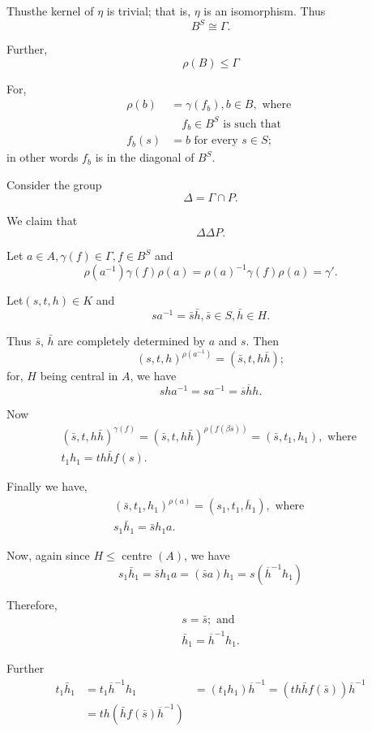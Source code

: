 Thus\pageoriginale the kernel of $\eta$ is trivial; that is, $\eta$ is an
isomorphism. Thus 
$$
B^S \cong \Gamma.
$$

Further,
$$
\rho (B)\leq \Gamma
$$

For,
\begin{align*}
  \rho (b)& =\gamma(f_b), b \in  B, \text{ where }\\
  &\quad f_b \in  B^S \text{ is such that}\\
  f_b(s)& = b \text{ for every }s \in  S;
\end{align*}
in other words $f_b$ is in the diagonal of $B^S$.

Consider the group
$$
\Delta =\Gamma \cap P.
$$

We claim that
$$
\Delta \Delta P.
$$

Let $a \in  A, \gamma (f) \in  \Gamma, f \in 
B^S$  and  
$$
\rho (a^{-1}) \gamma (f) \rho (a) = \rho (a)^{-1} \gamma (f) \rho (a)
= \gamma'. 
$$

Let\pageoriginale $(s,t,h) \in  K$ and 
$$
sa^{-1}= \bar{s} \bar{h}, \bar{s} \in  S, \bar{h} \in 
H. 
$$

Thus $\bar{s}$, $\bar{h}$ are completely determined by $a$ and
$s$. Then  
$$
(s, t, h)^{\rho(a^{-1})} =(\bar{s}, t, h \bar{h});
$$
for, $H$ being central in $A$, we have 
$$
sha^{-1} = sa^{-1} = \overline{s} \overline{h}h.
$$

Now 
\begin{gather*}
  (\bar{s}, t, h\bar{h})^{\gamma (f)}= (\bar{s},t,h\bar{h})^{\rho
  (f(\beta\bar{s}))} = (\bar{s}, t_1, h_1), \text{ where } \\ 
  t_1 h_1 = th \bar{h}f(s). 
\end{gather*}

Finally we have,
\begin{gather*}
  (\bar{s},  t_1,  h_1)^{\rho (a)} = (s_1, t_1, \bar{h}_1),  \text{ where } \\
  s_1 \bar{h}_1 =\bar{s} h_1 a.
\end{gather*}

Now,  again since $H \le $ centre  $(A)$, we have 
$$
s_1 \bar{h}_1 =\bar{s}h_1 a = (\bar{s} a)h_1 = s({\overline{h}}^{-1} h_1)
$$

Therefore,\pageoriginale
\begin{gather*}
  s= \bar{s} ; \text{ and } \\
  \bar{h}_1 =  \overline{h}^{-1}h_1.
\end{gather*}

Further
\begin{align*}
  t_1 \bar{h}_1 &= t_1 \overline{h}^{-1}h_1
  &= (t_1 h_1) \overline{h}^{-1} = (th\bar{h}f (\bar{s})) \overline{h}^{-1} \\
  &= th(\bar{h}f(\bar{s}) \overline{h}^{-1})
\end{align*}

